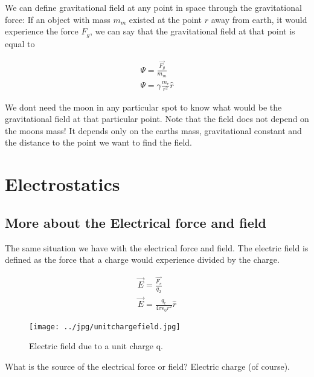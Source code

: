 We can define gravitational field at any point in space through the gravitational force: If an object with mass $m_m$ existed at the point $r$ away from earth, it would experience the force $F_g$, we can say that the gravitational field at that point is equal to

\begin{eqnarray}
\Psi = \frac{\vec{F_g}}{m_m} \\
\Psi = \gamma \frac{m_e}{r^2} \hat{r}
\end{eqnarray} \label{gravitationalfield}


We dont need the moon in any particular spot to know what would be the gravitational field at that particular point. Note that the field does not depend on the moons mass! It depends only on the earths mass, gravitational constant and the distance to the point we want to find the field.



\section{Electrostatics}




\subsection{More about the Electrical force and field}

The same situation we have with the electrical force and field. The electric field  is defined as the force that a charge would experience divided by the charge.


\begin{eqnarray}
\vec{E} = \frac{\vec{F_e}}{q_2} \\
\vec{E} =  \frac{q_e}{4 \pi \epsilon_0 r^2} \hat{r}
\end{eqnarray} \label{electricfield}



\begin{figure}[htbp]
\begin{center}
\texttt{[image: ../jpg/unitchargefield.jpg]}
\end{center}
\caption{Electric field due to a unit charge q.}
\label{UnitCh}
\end{figure}





What is the source of the electrical force or field? Electric charge (of course). 


